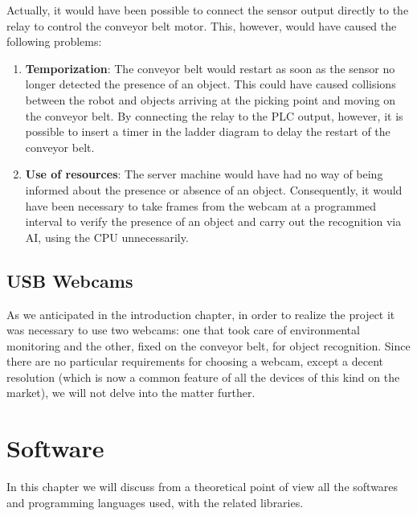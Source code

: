 \documentclass[a4paper,11pt]{report}
\theoremstyle{definition}
\theoremstyle{plain}
\begin{document}
            Actually, it would have been possible to connect the sensor output directly to the relay to control the conveyor belt motor. This, however, would have caused the following problems:
            \begin{enumerate}
                \item \textbf{Temporization}: The conveyor belt would restart as soon as the sensor no longer detected the presence of an object. This could have caused collisions between the robot and objects arriving at the picking point and moving on the conveyor belt. By connecting the relay to the PLC output, however, it is possible to insert a timer in the ladder diagram to delay the restart of the conveyor belt.
                \item \textbf{Use of resources}: The server machine would have had no way of being informed about the presence or absence of an object. Consequently, it would have been necessary to take frames from the webcam at a programmed interval to verify the presence of an object and carry out the recognition via AI, using the CPU unnecessarily. 
            \end{enumerate}
        \subsection{USB Webcams}
        As we anticipated in the introduction chapter, in order to realize the project it was necessary to use two webcams: one that took care of environmental monitoring and the other, fixed on the conveyor belt, for object recognition. Since there are no particular requirements for choosing a webcam, except a decent resolution (which is now a common feature of all the devices of this kind on the market), we will not delve into the matter further.
    \section{Software}
        In this chapter we will discuss from a theoretical point of view all the softwares and programming languages used, with the related libraries.
\end{document}
